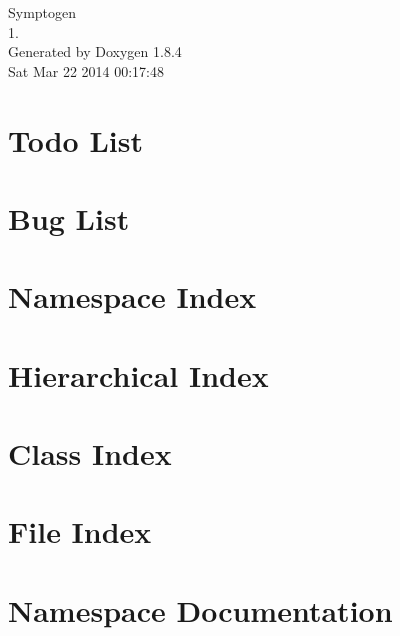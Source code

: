 \documentclass[twoside]{book}
\newcommand{\clearemptydoublepage}{%
  \newpage{\pagestyle{empty}\cleardoublepage}%
}
\begin{document}
\hypersetup{pageanchor=false}
\begin{titlepage}
\vspace*{7cm}
\begin{center}%
{\Large Symptogen \\[1ex]\large 1. }\\
\vspace*{1cm}
{\large Generated by Doxygen 1.8.4}\\
\vspace*{0.5cm}
{\small Sat Mar 22 2014 00:17:48}\\
\end{center}
\end{titlepage}
\clearemptydoublepage
\tableofcontents
\clearemptydoublepage
{}
\hypersetup{pageanchor=true}

\chapter{Todo List}
\label{todo}
\hypertarget{todo}{}

\chapter{Bug List}
\label{bug}
\hypertarget{bug}{}

\chapter{Namespace Index}

\chapter{Hierarchical Index}

\chapter{Class Index}

\chapter{File Index}

\chapter{Namespace Documentation}

\end{document}
